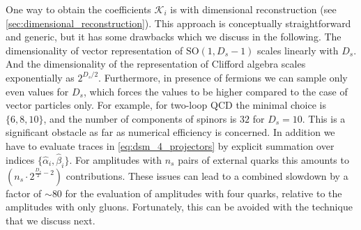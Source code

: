 One way to obtain the coefficients $\mathcal{K}_i$ 
is with dimensional reconstruction (see \cref{sec:dimensional_reconstruction}).
This approach is conceptually straightforward and generic, 
but it has some drawbacks which we discuss in the following.
The dimensionality of vector representation of $\mathrm{SO}(1,D_s-1)$ scales linearly with $D_s$.
And the dimensionality of the representation of Clifford algebra scales exponentially as $2^{D_s/2}$.
Furthermore, in presence of fermions we can sample only even values for $D_s$,
which forces the values to be higher compared to the case of vector particles only.
For example, for two-loop QCD the minimal choice is $\{6,8,10\}$, and the number of components
of spinors is $32$ for $D_s=10$. 
This is a significant obstacle as far as numerical efficiency is concerned.
In addition we have to evaluate traces in \cref{eq:dsm_4_projectors} by explicit summation
over indices $\{\hat{\alpha}_i,\hat{\beta}_i\}$.
For amplitudes with $n_s$ pairs of external quarks this amounts to $(n_s \cdot 2^{\frac{D_s}{2}-2})$ contributions.
These issues can lead to a combined slowdown by a factor of $\sim 80$ 
for the evaluation of amplitudes with four quarks, relative to the amplitudes with only gluons.
Fortunately, this can be avoided with the technique that we discuss next.

